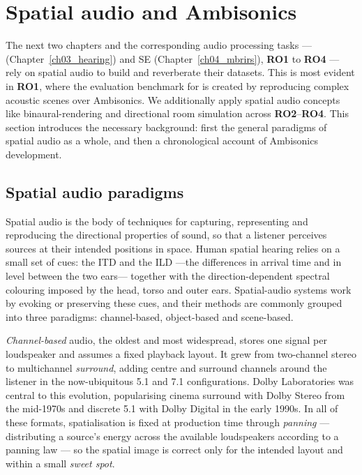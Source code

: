 \section{Spatial audio and Ambisonics}
\label{sec:bg_spatial}

The next two chapters and the corresponding audio processing tasks --- 
(Chapter~\ref{ch03_hearing}) and \acrshort{SE}
(Chapter~\ref{ch04_mbrirs}), \textbf{RO1} to \textbf{RO4} --- rely on spatial audio to build and
reverberate their datasets. This is most evident in \textbf{RO1},
where the evaluation benchmark for  is created by reproducing
complex acoustic scenes over Ambisonics. We additionally apply spatial audio concepts like
binaural-rendering and directional room simulation across
\textbf{RO2}--\textbf{RO4}. This section introduces the necessary background: first the
general paradigms of spatial audio as a whole, and then a chronological account of
Ambisonics development.

\subsection{Spatial audio paradigms}
\label{sec:bg_spatial_paradigms}
Spatial audio is the body of techniques for capturing, representing and
reproducing the directional properties of sound, so that a listener
perceives sources at their intended positions in space. Human spatial hearing relies on a small set of cues: the \acrfull{ITD} and the \acrfull{ILD} —the differences in arrival time and in level between the two ears— together with the direction-dependent spectral colouring imposed by the head, torso and outer ears. Spatial-audio systems work by evoking or preserving these cues, and their methods are commonly grouped into three paradigms: channel-based, object-based and
scene-based.

\emph{Channel-based} audio, the oldest and most widespread, stores one
signal per loudspeaker and assumes a fixed playback layout. It grew from
two-channel stereo to multichannel \emph{surround}, adding centre and
surround channels around the listener in the now-ubiquitous 5.1 and 7.1
configurations. Dolby Laboratories was
central to this evolution, popularising cinema surround with
Dolby Stereo from the mid-1970s and discrete 5.1 with Dolby Digital in the
early 1990s. In all of these formats, spatialisation is fixed at
production time through \emph{panning} --- distributing a source's energy
across the available loudspeakers according to a panning law --- so the
spatial image is correct only for the intended layout and within a small
\emph{sweet spot}.

